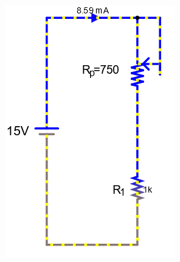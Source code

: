 \documentclass[a4paper]{article}
\begin{document}
\begin{figure}[H]
    \begin{subfigure}{0.333\textwidth}
        \includegraphics[width=.9\linewidth]{pot3}
    \end{subfigure}
    \begin{subfigure}{0.333\textwidth}

\end{subfigure}
\end{figure}
\end{document}
